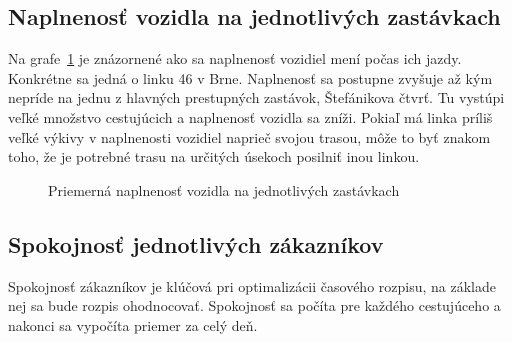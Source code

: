 \subsection*{Naplnenosť vozidla na jednotlivých zastávkach}
Na grafe~\ref{fig:averageLoad} je znázornené ako sa naplnenosť vozidiel mení počas ich jazdy.
Konkrétne sa jedná o linku 46 v Brne.
Naplnenosť sa postupne zvyšuje až kým nepríde na jednu z hlavných prestupných zastávok, Štefánikova čtvrť.
Tu vystúpi veľké množstvo cestujúcich a naplnenosť vozidla sa zníži.
Pokiaľ má linka príliš veľké výkivy v naplnenosti vozidiel naprieč svojou trasou, môže to byť znakom toho, že je potrebné trasu na určitých úsekoch posilniť inou linkou.
\begin{figure}[h]\label{fig:averageLoad}
  \centering
  \caption{Priemerná naplnenosť vozidla na jednotlivých zastávkach}
\end{figure}




\subsection*{Spokojnosť jednotlivých zákazníkov}
Spokojnosť zákazníkov je klúčová pri optimalizácii časového rozpisu, na základe nej sa bude rozpis ohodnocovať.
Spokojnosť sa počíta pre každého cestujúceho a nakonci sa vypočíta priemer za celý deň.


